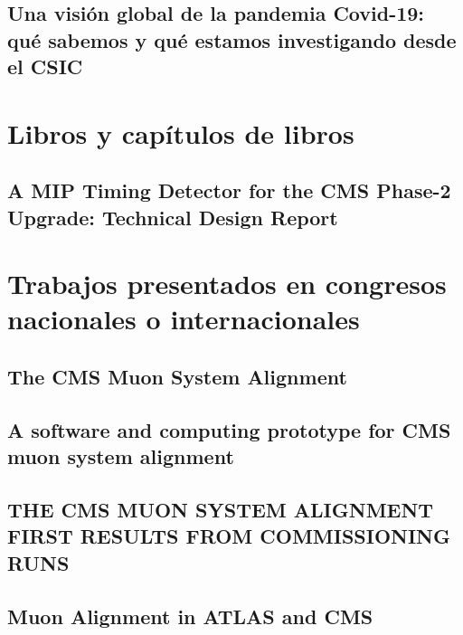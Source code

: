 \documentclass[a4paper, 11pt, twoside, openright]{report}
\begin{document}
\subsection{Una visión global de la pandemia Covid-19: qué sabemos y qué estamos investigando desde el CSIC}


\section{Libros y capítulos de libros}

\subsection{A MIP Timing Detector for the CMS Phase-2 Upgrade: Technical Design Report}



\section{Trabajos presentados en congresos nacionales o internacionales}

\subsection{The CMS Muon System Alignment}

\subsection{A software and computing prototype for CMS muon system alignment}

\subsection{THE CMS MUON SYSTEM ALIGNMENT FIRST RESULTS FROM COMMISSIONING RUNS}

\subsection{Muon Alignment in ATLAS and CMS}

\end{document}

